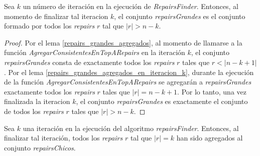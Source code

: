 \documentclass[11pt,a4paper,twoside]{tesis}
\begin{document}
\begin{lemma}\label{fin_iteracion_k_repairs}
Sea $k$ un número de iteración en la ejecución de \textit{RepairsFinder}. Entonces, al momento de finalizar tal iteracion $k$, el conjunto \textit{repairsGrandes} es el conjunto formado por todos los \textit{repairs} $r$ tal que $|r|>n-k$.
\end{lemma}

\begin{proof}
Por el lema \ref{repairs_grandes_agregados}, al momento de llamarse a la función \textit{AgregarConsistentesEnTopARepairs} en la iteración $k$, el conjunto \textit{repairsGrandes} consta de exactamente todos los \textit{repairs} $r$ tales que $r < |n - k + 1|$. Por el lema \ref{repairs_grandes_agregados_en_iteracion_k}, durante la ejecución de la función \textit{AgregarConsistentesEnTopARepairs} se agregarán a \textit{repairsGrandes} exactamente todos los \textit{repairs} $r$ tales que $|r| = n - k + 1$. Por lo tanto, una vez finalizada la iteracion $k$, el conjunto \textit{repairsGrandes} es exactamente el conjunto de todos los \textit{repairs} $r$ tales que $|r| > n -k $.
\end{proof}


\begin{lemma}\label{lema_iteracion_k_repairsChicos}
Sea $k$ una iteración en la ejecución del algoritmo \textit{repairsFinder}. Entonces, al finalizar tal iteración, todos los \textit{repairs} $r$ tal que $|r| = k$ han sido agregados al conjunto \textit{repairsChicos}.
\end{lemma}
\end{document}
